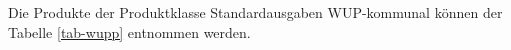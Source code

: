 Die Produkte der Produktklasse Standardausgaben WUP-kommunal können der Tabelle \ref{tab-wupp} entnommen werden.



